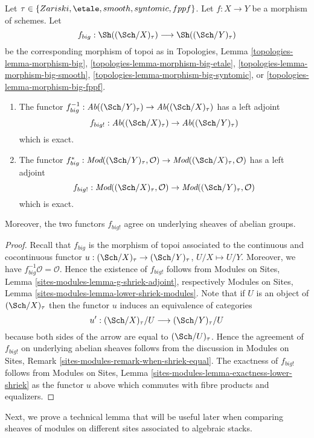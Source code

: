 \begin{lemma}
\label{lemma-exactness-lower-shriek}
Let $\tau \in \{Zariski, \etale, smooth, syntomic, fppf\}$.
Let $f : X \to Y$ be a morphism of schemes. Let
$$
f_{big} :
\Sh((\Sch/X)_\tau)
\longrightarrow
\Sh((\Sch/Y)_\tau)
$$
be the corresponding morphism of topoi as in
Topologies, Lemma
\ref{topologies-lemma-morphism-big},
\ref{topologies-lemma-morphism-big-etale},
\ref{topologies-lemma-morphism-big-smooth},
\ref{topologies-lemma-morphism-big-syntomic}, or
\ref{topologies-lemma-morphism-big-fppf}.
\begin{enumerate}
\item The functor
$f_{big}^{-1} : \textit{Ab}((\Sch/Y)_\tau) \to \textit{Ab}((\Sch/X)_\tau)$
has a left adjoint
$$
f_{big!} : \textit{Ab}((\Sch/X)_\tau) \to \textit{Ab}((\Sch/Y)_\tau)
$$
which is exact.
\item The functor
$f_{big}^* :
\textit{Mod}((\Sch/Y)_\tau, \mathcal{O})
\to
\textit{Mod}((\Sch/X)_\tau, \mathcal{O})$
has a left adjoint
$$
f_{big!} :
\textit{Mod}((\Sch/X)_\tau, \mathcal{O})
\to
\textit{Mod}((\Sch/Y)_\tau, \mathcal{O})
$$
which is exact.
\end{enumerate}
Moreover, the two functors $f_{big!}$ agree on underlying sheaves
of abelian groups.
\end{lemma}

\begin{proof}
Recall that $f_{big}$ is the morphism of topoi associated to the
continuous and cocontinuous functor
$u : (\Sch/X)_\tau \to (\Sch/Y)_\tau$, $U/X \mapsto U/Y$.
Moreover, we have $f_{big}^{-1}\mathcal{O} = \mathcal{O}$.
Hence the existence of $f_{big!}$ follows from
Modules on Sites, Lemma \ref{sites-modules-lemma-g-shriek-adjoint},
respectively
Modules on Sites, Lemma \ref{sites-modules-lemma-lower-shriek-modules}.
Note that if $U$ is an object of $(\Sch/X)_\tau$ then the functor
$u$ induces an equivalence of categories
$$
u' :
(\Sch/X)_\tau/U
\longrightarrow
(\Sch/Y)_\tau/U
$$
because both sides of the arrow are equal to $(\Sch/U)_\tau$.
Hence the agreement of $f_{big!}$ on underlying abelian sheaves
follows from the discussion in
Modules on Sites, Remark \ref{sites-modules-remark-when-shriek-equal}.
The exactness of $f_{big!}$ follows from
Modules on Sites, Lemma \ref{sites-modules-lemma-exactness-lower-shriek}
as the functor $u$ above which commutes with fibre products and equalizers.
\end{proof}

\noindent
Next, we prove a technical lemma that will be useful later when comparing
sheaves of modules on different sites associated to algebraic stacks.

